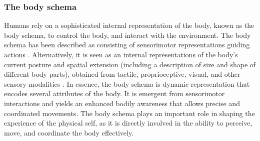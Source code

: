 
\subsubsection{The body schema}
Humans rely on a sophisticated internal representation of the body, known as the body schema, to control the body, and interact with the environment. The body schema has been described as consisting of sensorimotor representations guiding actions \cite{Maravita2003MultisensoryIntegrationBody,Asada2018168Proprioceptionbodyschema}. Alternatively, it is seen as an internal representations of the body's current posture and spatial extension \cite{Vignemont2010Bodyschemabody} (including a description of size and shape of different body parts), obtained from tactile, proprioceptive, visual, and other sensory modalities \cite{Medina2010mapsformspace}. In essence, the body schema is dynamic representation that encodes several attributes of the body\cite{Vignemont20213C1Whatisbody,Morasso2015Revisitingbodyschema,Asada2018168Proprioceptionbodyschema}. It is emergent from sensorimotor interactions and yields an enhanced bodily awareness that allows precise and coordinated movements. The body schema plays an important role in shaping the experience of the physical self, as it is directly involved in the ability to perceive, move, and coordinate the body effectively.



